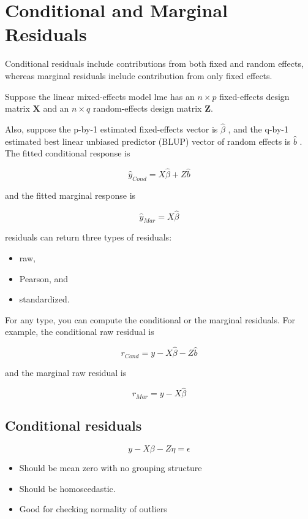 \documentclass[Main.tex]{subfiles}
\begin{document}
\section{Conditional and Marginal Residuals}
Conditional residuals include contributions from both fixed and random effects, whereas marginal residuals include contribution from only fixed effects.

Suppose the linear mixed-effects model lme has an $n \times p$ fixed-effects design matrix $\boldsymbol{X}$ and an $n \times q$ random-effects design matrix $\boldsymbol{Z}$. 

Also, suppose the p-by-1 estimated fixed-effects vector is $\hat{\beta}$ , and the q-by-1 estimated best linear unbiased predictor (BLUP) 
vector of random effects is $\hat{b}$ . The fitted conditional response is

\[ \hat{y}_{Cond} = X \hat{\beta} + Z \hat{b} \]

and the fitted marginal response is


\[ \hat{y}_{Mar} = X \hat{\beta} \]

residuals can return three types of residuals:
\begin{itemize} 
	\item raw, 
	\item Pearson, and 
	\item standardized.\end{itemize} For any type, you can compute the conditional or the marginal residuals. For example, the conditional raw residual is


\[ r_{Cond} = y - X \hat{\beta} - Z \hat{b} \]

and the marginal raw residual is



\[ r_{Mar} = y - X \hat{\beta} \]







\subsection*{Conditional residuals}
\[y - X\beta - Z \eta = \epsilon \]
\begin{itemize}
	\item
	Should be mean zero with no grouping structure
	\item
	Should be homoscedastic.
	\item
	Good for checking normality of outliers
\end{itemize}
\end{document}
